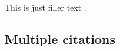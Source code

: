 \documentclass[a4paper]{article}
\begin{document}

This is just filler text \autocite{companion}.

\subsection*{Multiple citations}


\cite{companion,augustine,bertram,cotton,hammond,massa,murray}

\clearpage


\printbibliography
\end{document}
